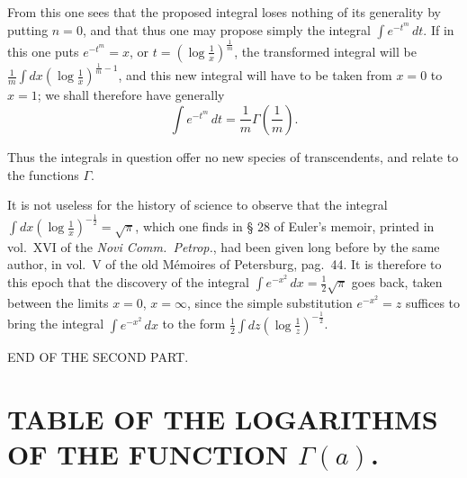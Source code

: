 \documentclass{article}
\begin{document}
From this one sees that the proposed integral loses nothing of its generality by putting $n=0$, and that thus one may propose simply the integral $\displaystyle\int e^{-t^{m}}\,dt$. If in this one puts $e^{-t^{m}}=x$, or $t=\left(\log\frac{1}{x}\right)^{\frac{1}{m}}$, the transformed integral will be $\displaystyle\frac{1}{m}\int dx\left(\log\frac{1}{x}\right)^{\frac{1}{m}-1}$, and this new integral will have to be taken from $x=0$ to $x=1$; we shall therefore have generally
\[ \int e^{-t^{m}}\,dt=\frac{1}{m}\Gamma\left(\frac{1}{m}\right). \]

Thus the integrals in question offer no new species of transcendents, and relate to the functions $\Gamma$.

It is not useless for the history of science to observe that the integral $\displaystyle\int dx\left(\log\frac{1}{x}\right)^{-\frac{1}{2}}=\sqrt{\pi}$, which one finds in § 28 of Euler's memoir, printed in vol.\ XVI of the \emph{Novi Comm.\ Petrop.}, had been given long before by the same author, in vol.\ V of the old Mémoires of Petersburg, pag.\ 44. It is therefore to this epoch that the discovery of the integral $\displaystyle\int e^{-x^{2}}\,dx=\frac{1}{2}\sqrt{\pi}$ goes back, taken between the limits $x=0$, $x=\infty$, since the simple substitution $e^{-x^{2}}=z$ suffices to bring the integral $\displaystyle\int e^{-x^{2}}\,dx$ to the form $\displaystyle\frac{1}{2}\int dz\left(\log\frac{1}{z}\right)^{-\frac{1}{2}}$.

END OF THE SECOND PART.


\section*{TABLE OF THE LOGARITHMS OF THE FUNCTION $\Gamma(a)$.}
\end{document}
